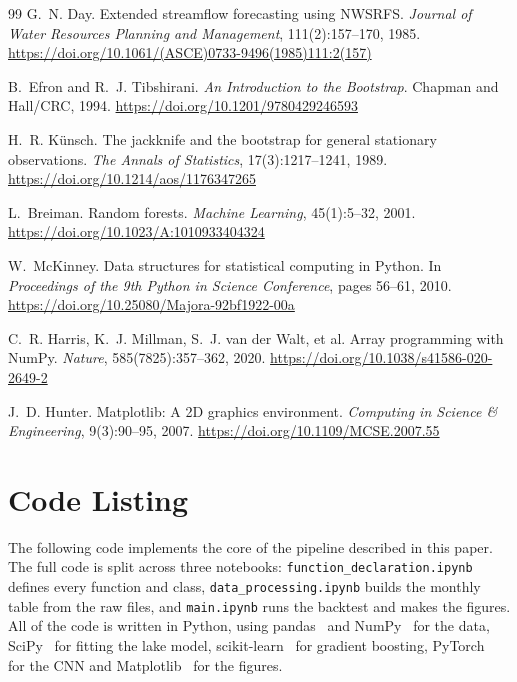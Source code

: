 \documentclass{article}
\begin{document}
\begin{thebibliography}{99}
G.~N. Day. Extended streamflow forecasting using NWSRFS. \emph{Journal of Water Resources Planning
and Management}, 111(2):157--170, 1985. \url{https://doi.org/10.1061/(ASCE)0733-9496(1985)111:2(157)}

B.~Efron and R.~J. Tibshirani. \emph{An Introduction to the Bootstrap}. Chapman and Hall/CRC,
1994. \url{https://doi.org/10.1201/9780429246593}

H.~R. K\"unsch. The jackknife and the bootstrap for general stationary observations. \emph{The
Annals of Statistics}, 17(3):1217--1241, 1989. \url{https://doi.org/10.1214/aos/1176347265}

L.~Breiman. Random forests. \emph{Machine Learning}, 45(1):5--32, 2001.
\url{https://doi.org/10.1023/A:1010933404324}

W.~McKinney. Data structures for statistical computing in Python. In \emph{Proceedings of the
9th Python in Science Conference}, pages 56--61, 2010.
\url{https://doi.org/10.25080/Majora-92bf1922-00a}

C.~R. Harris, K.~J. Millman, S.~J. van der Walt, et al. Array programming with NumPy.
\emph{Nature}, 585(7825):357--362, 2020. \url{https://doi.org/10.1038/s41586-020-2649-2}

J.~D. Hunter. Matplotlib: A 2D graphics environment. \emph{Computing in Science \& Engineering},
9(3):90--95, 2007. \url{https://doi.org/10.1109/MCSE.2007.55}

\end{thebibliography}

\clearpage
\appendix

\section{Code Listing}
\label{app:code}

The following code implements the core of the pipeline described in this paper. The full code is
split across three notebooks: \texttt{function\_declaration.ipynb} defines every function and
class, \texttt{data\_processing.ipynb} builds the monthly table from the raw files, and
\texttt{main.ipynb} runs the backtest and makes the figures. All of the code is written in Python,
using pandas~\cite{pandas} and NumPy~\cite{numpy} for the data, SciPy~\cite{scipy} for fitting
the lake model, scikit-learn~\cite{sklearn} for gradient boosting, PyTorch~\cite{pytorch} for the
CNN and Matplotlib~\cite{matplotlib} for the figures.
\end{document}

